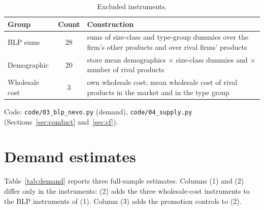 \documentclass[11pt]{article}
\newcommand{\code}[1]{\texttt{#1}}
\begin{document}
\begin{table}[h!]
\centering\small
\begin{tabularx}{\textwidth}{@{}lcL@{}}
\toprule
Group & Count & Construction \\
\midrule
BLP sums & 28 & sums of size-class and type-group dummies over the firm's other products and over rival firms' products \\
Demographic & 20 & store mean demographics $\times$ size-class dummies and $\times$ number of rival products \\
Wholesale cost & 3 & own wholesale cost; mean wholesale cost of rival products in the market and in the type group \\
\bottomrule
\end{tabularx}
\caption{Excluded instruments.}\label{tab:iv}
\end{table}

Code: \code{code/03\_blp\_nevo.py} (demand), \code{code/04\_supply.py}
(Sections~\ref{sec:conduct} and~\ref{sec:cf}).

\section{Demand estimates}\label{sec:demand}

Table~\ref{tab:demand} reports three full-sample estimates. Columns (1) and (2) differ only
in the instruments: (2) adds the three wholesale-cost instruments to the BLP instruments of
(1). Column (3) adds the promotion controls to (2).
\end{document}
